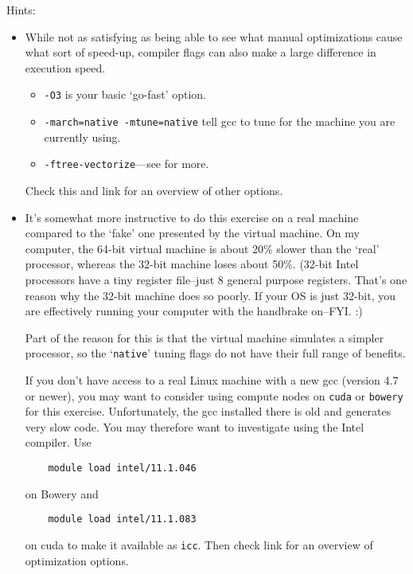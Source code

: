 \documentclass[11pt]{article}
\begin{document}
Hints:
\begin{itemize}
  \item While not as satisfying as being able to see what
    manual optimizations cause what sort of speed-up, compiler
    flags can also make a large difference in execution speed.
    \begin{itemize}
    \item \texttt{-O3} is your basic `go-fast' option.
    \item \texttt{-march=native -mtune=native} tell gcc to tune for
      the machine you are currently using.
    \item \texttt{-ftree-vectorize}---see
      for more.
    \end{itemize}
    Check
    {this} and
    link for an overview of other options.

  \item It's somewhat more instructive to do this exercise on a
    real machine compared to the `fake' one presented by the virtual
    machine. On my computer, the 64-bit virtual machine is about
    20\% slower than the `real' processor, whereas the 32-bit
    machine loses about 50\%. (32-bit Intel processors have a tiny
    register file--just 8 general purpose registers. That's one reason
    why the 32-bit machine does so poorly. If your OS is just 32-bit,
    you are effectively running your computer with the handbrake
    on--FYI. :)

    Part of the reason for this is that the virtual machine simulates
    a simpler processor, so the `\texttt{native}' tuning flags do not
    have their full range of benefits.

    If you don't have access to a real Linux machine with a new gcc
    (version 4.7 or newer), you may want to consider using compute
    nodes on \texttt{cuda} or \texttt{bowery} for this exercise.
    Unfortunately, the gcc installed there is old and generates very
    slow code. You may therefore want to investigate using the Intel
    compiler. Use
    \begin{lstlisting}
    module load intel/11.1.046
    \end{lstlisting}
    on Bowery and
    \begin{lstlisting}
    module load intel/11.1.083
    \end{lstlisting}
    on cuda to make it available as \texttt{icc}. Then check
    link for an overview of optimization options.


\end{itemize}
\end{document}
